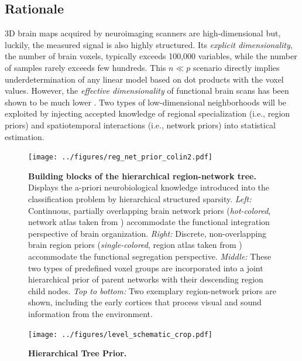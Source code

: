 \documentclass[runningheads,a4paper]{llncs}
\begin{document}
\subsection{Rationale}
3D brain maps acquired by neuroimaging
scanners are high-dimensional but, luckily,
the measured signal is also highly structured.
Its \textit{explicit dimensionality}, the number of brain voxels,
typically exceeds 100,000 variables, while the number
of samples rarely exceeds few hundreds.
This $n \ll p$ scenario directly implies underdetermination of any
linear model based on dot products with the voxel values.
However, the \textit{effective dimensionality} of functional brain scans has been
shown to be much lower \cite{bzdok2015semi}.
Two types of low-dimensional neighborhoods will be exploited by
injecting accepted knowledge of regional specialization
(i.e., region priors)
and spatiotemporal interactions
(i.e., network priors)
into statistical estimation.
\begin{figure}
  \vspace{-0.6cm}
  \centering
  \texttt{[image: ../figures/reg\_net\_prior\_colin2.pdf]}
  \vspace{-0.3cm}
  \caption{\textbf{Building blocks of the hierarchical region-network tree.}
  Displays the a-priori neurobiological knowledge
  introduced into the classification problem 
  by hierarchical structured sparsity.
  \textit{Left:} Continuous, partially overlapping brain network priors
  (\textit{hot-colored}, network atlas taken from \cite{smith2009})
  accommodate the functional integration
  perspective of brain organization.
  \textit{Right:} Discrete, non-overlapping brain region priors
  (\textit{single-colored}, region atlas taken from \cite{crad12})
  accommodate the functional segregation perspective.
  \textit{Middle:} These two types of predefined voxel groups are incorporated
  into a joint hierarchical prior of parent networks with their
  descending region child nodes.
  \textit{Top to bottom:} Two exemplary region-network priors
  are shown, including
  the early cortices that process
  visual and sound information from the environment.
  }
  \vspace{-0.6cm}
  \label{fig_priors}
\end{figure}
%
\begin{figure}
\begin{centering}
\texttt{[image: ../figures/level\_schematic\_crop.pdf]}
\end{centering}
\vspace{-0.7cm}
  \caption{\textbf{Hierarchical Tree Prior.}
  }
\label{fig_prior_penalty}
\end{figure}
\end{document}
